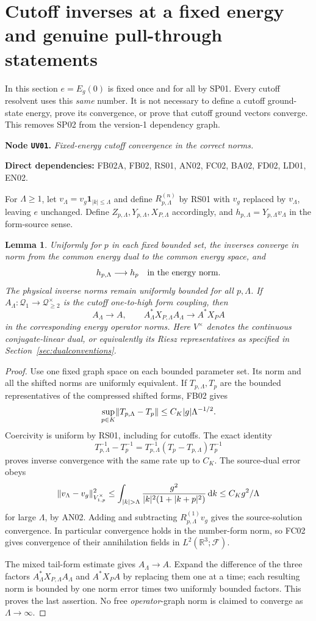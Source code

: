 \documentclass[11pt,a4paper]{article}
\newtheorem{lemma}[theorem]{Lemma}
\theoremstyle{remark}\newtheorem{remark}[theorem]{Remark}
\newcommand{\R}{\mathbb R}\newcommand{\C}{\mathbb C}\newcommand{\N}{\mathbb N}
\newcommand{\F}{\mathcal F}\newcommand{\Q}{\mathcal Q}\newcommand{\HH}{\mathcal H}
\newcommand{\abs}[1]{\lvert #1\rvert}\newcommand{\rankone}[2]{\lvert #1\rangle\langle #2\rvert}
\newcommand{\dd}{\,\mathrm d}\newcommand{\almosteverywhere}{\text{a.e.}}
\newcommand{\node}[3]{\par\Needspace{6\baselineskip}\smallskip\hypertarget{node:#1}{}\label{nodepage:#1}\noindent\textbf{Node \texttt{#1}.} \textit{#2.}\par\noindent\textbf{Direct dependencies:} #3.\par}
\begin{document}
\section{Cutoff inverses at a fixed energy and genuine pull-through statements}\label{sec:kernel}
In this section $e=E_g(0)$ is fixed once and for all by SP01. Every cutoff resolvent uses this \emph{same} number. It is not necessary to define a cutoff ground-state energy, prove its convergence, or prove that cutoff ground vectors converge. This removes SP02 from the version-1 dependency graph.

\node{UV01}{Fixed-energy cutoff convergence in the correct norms}{FB02A, FB02, RS01, AN02, FC02, BA02, FD02, LD01, EN02}
For $\Lambda\geq1$, let $v_\Lambda=v_g\mathbf1_{\abs k\leq\Lambda}$ and define $R_{p,\Lambda}^{(n)}$ by RS01 with $v_g$ replaced by $v_\Lambda$, leaving $e$ unchanged. Define $Z_{p,\Lambda},Y_{p,\Lambda},X_{P,\Lambda}$ accordingly, and
$h_{p,\Lambda}=Y_{p,\Lambda}v_\Lambda$ in the form-source sense.

\begin{lemma}\label{lem:fixedcutoff}
Uniformly for $p$ in each fixed bounded set, the inverses converge in norm from the common energy dual to the common energy space, and
\[
 h_{p,\Lambda}\longrightarrow h_p\quad\hbox{in the energy norm}.
\]
The physical inverse norms remain uniformly bounded for all $p,\Lambda$. If $A_\Lambda:\Q_1\to\Q_{\geq2}^{\times}$ is the cutoff one-to-high form coupling, then
\[
 A_\Lambda\to A,\qquad
 A_\Lambda^*X_{P,\Lambda}A_\Lambda\to A^*X_PA
\]
in the corresponding energy operator norms. Here $V^{\times}$ denotes the continuous conjugate-linear dual, or equivalently its Riesz representatives as specified in Section~\ref{sec:dualconventions}.
\end{lemma}
\begin{proof}
Use one fixed graph space on each bounded parameter set. Its norm and all the shifted norms are uniformly equivalent. If $T_{p,\Lambda},T_p$ are the bounded representatives of the compressed shifted forms, FB02 gives
\[
 \sup_{p\in K}\norm{T_{p,\Lambda}-T_p}\leq C_K\abs g\Lambda^{-1/2}.
\]
Coercivity is uniform by RS01, including for cutoffs. The exact identity
\[
 T_{p,\Lambda}^{-1}-T_p^{-1}
 =T_{p,\Lambda}^{-1}(T_p-T_{p,\Lambda})T_p^{-1}
\]
proves inverse convergence with the same rate up to $C_K$. The source-dual error obeys
\[
 \norm{v_\Lambda-v_g}_{V_{1,p}^{\times}}^2
 \leq \int_{\abs k>\Lambda}
       \frac{g^2}{\abs k^2(1+\abs{k+p}^2)}\dd k
 \leq C_Kg^2/\Lambda
\]
for large $\Lambda$, by AN02. Adding and subtracting
$R_{p,\Lambda}^{(1)}v_g$ gives the source-solution convergence. In particular convergence holds in the number-form norm, so FC02 gives convergence of their annihilation fields in $L^2(\R^3;\F)$.

The mixed tail-form estimate gives $A_\Lambda\to A$. Expand the difference of the three factors $A_\Lambda^*X_{P,\Lambda}A_\Lambda$ and $A^*X_PA$ by replacing them one at a time; each resulting norm is bounded by one norm error times two uniformly bounded factors. This proves the last assertion. No free \emph{operator}-graph norm is claimed to converge as $\Lambda\to\infty$.
\end{proof}
\end{document}
